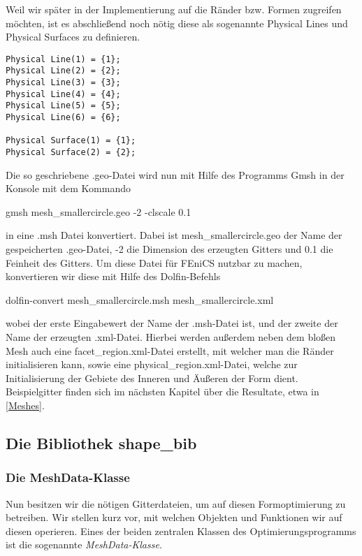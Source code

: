Weil wir später in der Implementierung auf die Ränder bzw. Formen zugreifen möchten, ist es abschließend noch nötig diese als sogenannte \textsf{Physical Lines} und \textsf{Physical Surfaces} zu definieren. 

\begin{lstlisting}
Physical Line(1) = {1};
Physical Line(2) = {2};
Physical Line(3) = {3};
Physical Line(4) = {4};
Physical Line(5) = {5};
Physical Line(6) = {6};

Physical Surface(1) = {1};
Physical Surface(2) = {2};
\end{lstlisting}

Die so geschriebene \textsf{.geo}-Datei wird nun mit Hilfe des Programms \textsf{Gmsh} in der Konsole mit dem Kommando

\begin{center}
\textsf{gmsh mesh\_smallercircle.geo -2 -clscale 0.1}
\end{center}

in eine \textsf{.msh} Datei konvertiert. Dabei ist \textsf{mesh\_smallercircle.geo}
der Name der gespeicherten \textsf{.geo}-Datei, \textsf{-2} die Dimension des erzeugten Gitters und \textsf{0.1} die Feinheit des Gitters. Um diese Datei für FEniCS nutzbar zu machen, konvertieren wir diese mit Hilfe des Dolfin-Befehls

\begin{center}
\textsf{dolfin-convert mesh\_smallercircle.msh mesh\_smallercircle.xml}
\end{center}

wobei der erste Eingabewert der Name der \textsf{.msh}-Datei ist, und der zweite der Name der erzeugten \textsf{.xml}-Datei. Hierbei werden außerdem neben dem bloßen Mesh auch eine \textsf{facet\_region.xml}-Datei erstellt, mit welcher man die Ränder initialisieren kann, sowie eine \textsf{physical\_region.xml}-Datei, welche zur Initialisierung der Gebiete des Inneren und Äußeren der Form dient.
Beispielgitter finden sich im nächsten Kapitel über die Resultate, etwa in \ref{Meshes}.

\subsection{Die Bibliothek shape\_bib}
\subsubsection{Die MeshData-Klasse}
\label{meshdataclass}
Nun besitzen wir die nötigen Gitterdateien, um auf diesen Formoptimierung zu betreiben. Wir stellen kurz vor, mit welchen Objekten und Funktionen wir auf diesen operieren. Eines der beiden zentralen Klassen des Optimierungsprogramms ist die sogenannte \textit{MeshData-Klasse}. 

